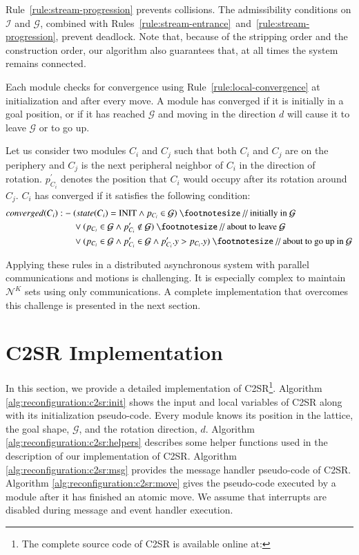Rule~\ref{rule:stream-progression} prevents collisions. The admissibility conditions on $\mathcal{I}$ and $\mathcal{G}$, combined with Rules~\ref{rule:stream-entrance}~and~\ref{rule:stream-progression}, prevent deadlock. Note that, because of the stripping order and the construction order, our algorithm also guarantees that, at all times the system remains connected.

Each module checks for convergence using Rule~\ref{rule:local-convergence} at initialization and after every move. A module has converged if it is initially in a goal position, or if it has reached $\mathcal{G}$ and moving in the direction $d$ will cause it to leave $\mathcal{G}$ or to go up.

\begin{myRule}
	\label{rule:local-convergence}
	Let us consider two modules $C_i$ and $C_j$ such that both $C_i$ and $C_j$ are on the periphery and $C_j$ is the next peripheral neighbor of $C_i$ in the direction of rotation. $p^{\prime}_{C_i}$ denotes the position that $C_i$ would occupy after its rotation around $C_j$. $C_i$ has converged if it satisfies the following condition:
	\begin{align*}
converged(C_i) :-\ & (state(C_i) = \text{INIT} \land p_{C_i} \in \mathcal{G})\ \text{\footnotesize // initially in $\mathcal{G}$}\\
& \lor (p_{C_i} \in \mathcal{G} \land p^{\prime}_{C_i} \notin \mathcal{G})\ \text{\footnotesize // about to leave $\mathcal{G}$} \\
& \lor (p_{C_i} \in \mathcal{G} \land p^{\prime}_{C_i} \in \mathcal{G} \land p^{\prime}_{C_i}.y > p_{C_i}.y)\ \text{\footnotesize // about to go up in $\mathcal{G}$}
	\end{align*}
\end{myRule}

Applying these rules in a distributed asynchronous system with parallel communications and motions is challenging. It is especially complex to maintain $\mathcal{N}^K$ sets using only communications. A complete implementation that overcomes this challenge is presented in the next section.

\section{C2SR Implementation}
\label{section:reconfiguration:algorithm}

In this section, we provide a detailed implementation of C2SR\footnote{The complete source code of C2SR is available online at: \VisibleSimUrl{}}. Algorithm \ref{alg:reconfiguration:c2sr:init} shows the input and local variables of C2SR along with its initialization pseudo-code. Every module knows its position in the lattice, the goal shape, $\mathcal{G}$, and the rotation direction, $d$. Algorithm \ref{alg:reconfiguration:c2sr:helpers} describes some helper functions used in the description of our implementation of C2SR. Algorithm \ref{alg:reconfiguration:c2sr:msg} provides the message handler pseudo-code of C2SR. Algorithm \ref{alg:reconfiguration:c2sr:move} gives the pseudo-code executed by a module after it has finished an atomic move. We assume that interrupts are disabled during message and event handler execution. 

